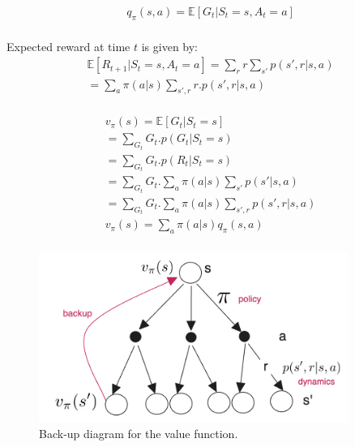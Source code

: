 \begin{equation}
    \begin{split}
        q_\pi(s, a) = \mathbb{E}[G_t | S_t = s, A_t = a] \\
        \label{eq:mdp-action-value-function}
    \end{split}
 \end{equation}

 Expected reward at time $t$ is given by:
 \begin{equation}
    \begin{split}
        \mathbb{E}[R_{t+1} | S_t = s, A_t = a] = \sum_{r} r \sum_{s'} p(s',r|s, a) \\
        = \sum_{a} \pi(a|s) \sum_{s',r} r . p(s',r|s, a) \\
        \label{eq:mdp-expected-reward}
    \end{split}
 \end{equation}

 \begin{equation}
    \begin{split}
        v_\pi(s) = \mathbb{E}[G_t | S_t = s]  \\
         = \sum_{G_t} G_t . p(G_t | S_t = s) \\
         = \sum_{G_t} G_t . p(R_t | S_t = s) \\
         = \sum_{G_t} G_t . \sum_{a} \pi(a|s) \sum_{s'} p(s'|s, a) \\
         = \sum_{G_t} G_t . \sum_{a} \pi(a|s) \sum_{s',r} p(s',r|s, a) \\
         v_\pi(s)  = \sum_{a} \pi(a|s) q_\pi(s, a) \\
        \label{eq:mdp-bellman-equation}
    \end{split}
 \end{equation}

 \begin{figure}[h]
    \centering
    \includegraphics[width=0.9\textwidth]{img/backup_diagram2.png}
    \caption{Back-up diagram for the value function.}
    \label{fig:mdp-back-up-diagram}
 \end{figure}


